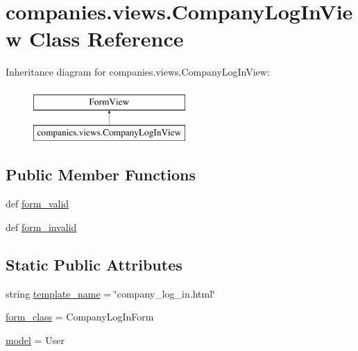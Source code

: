 \hypertarget{classcompanies_1_1views_1_1_company_log_in_view}{\section{companies.\-views.\-Company\-Log\-In\-View Class Reference}
\label{classcompanies_1_1views_1_1_company_log_in_view}
}
Inheritance diagram for companies.\-views.\-Company\-Log\-In\-View\-:\begin{figure}[H]
\begin{center}
\leavevmode
\includegraphics[height=2.000000cm]{classcompanies_1_1views_1_1_company_log_in_view}
\end{center}
\end{figure}
\subsection*{Public Member Functions}
\begin{DoxyCompactItemize}
\item 
def \hyperlink{classcompanies_1_1views_1_1_company_log_in_view_a02d2d0d02af5bc0d3e2f4bf74efadf6b}{form\-\_\-valid}
\item 
def \hyperlink{classcompanies_1_1views_1_1_company_log_in_view_ae5d754ee2fedf72a3c679e88315a2524}{form\-\_\-invalid}
\end{DoxyCompactItemize}
\subsection*{Static Public Attributes}
\begin{DoxyCompactItemize}
\item 
string \hyperlink{classcompanies_1_1views_1_1_company_log_in_view_a6f2153bb78773904a49c0b97853d54f6}{template\-\_\-name} = \char`\"{}company\-\_\-log\-\_\-in.\-html\char`\"{}
\item 
\hyperlink{classcompanies_1_1views_1_1_company_log_in_view_a5e51ffcef3fc128a539a000e7cfdba99}{form\-\_\-class} = Company\-Log\-In\-Form
\item 
\hyperlink{classcompanies_1_1views_1_1_company_log_in_view_ad091f9304db7e7e99fbc2873c48a308b}{model} = User
\end{DoxyCompactItemize}


